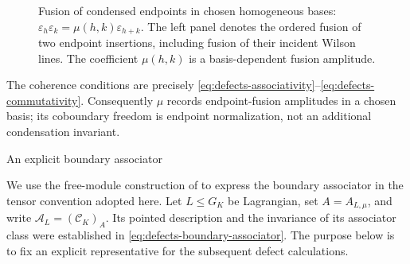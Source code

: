 \documentclass[12pt]{amsart}
\makeatletter
\renewcommand\subsection{\@startsection{subsection}{2}%
  \z@{.5\linespacing\@plus.7\linespacing}{-.5em}%
  {\normalfont\bfseries}}
\numberwithin{equation}{section}
\theoremstyle{definition}
\makeatother
\begin{document}
\begin{figure}[htbp]
\centering
{}
\caption{Fusion of condensed endpoints in chosen homogeneous bases:
$\varepsilon_h\varepsilon_k=\mu(h,k)\varepsilon_{h+k}$.
The left panel denotes the ordered fusion of two endpoint insertions,
including fusion of their incident Wilson lines. The coefficient
$\mu(h,k)$ is a basis-dependent fusion amplitude.}
\label{fig:condensation}
\end{figure}



The coherence conditions are precisely
\eqref{eq:defects-associativity}--\eqref{eq:defects-commutativity}.
Consequently $\mu$ records endpoint-fusion amplitudes in a chosen basis;
its coboundary freedom is endpoint normalization, not an additional
condensation invariant.


\subsection{An explicit boundary associator}

We use the free-module construction of
\cite[Theorem~A.4]{DavydovSimmons2018} to express the boundary
associator in the tensor convention adopted here.
Let $L\le G_K$ be Lagrangian, set $A=A_{L,\mu}$, and write
$\mathcal A_L=(\mathcal C_K)_A$.
Its pointed description and the invariance of its associator class
were established in \eqref{eq:defects-boundary-associator}.
The purpose below is to fix an explicit representative for the
subsequent defect calculations.
\end{document}
